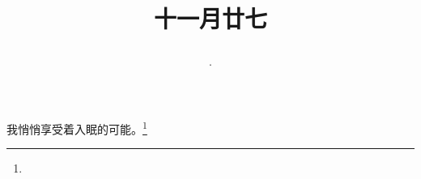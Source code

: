 \title{\date[d=8,m=1,y=2024][year:cn-y,年,month:cn,day:cn,日,·,weekday]·十一月廿七 }
我悄悄享受着入眠的可能。\footnote{ }


